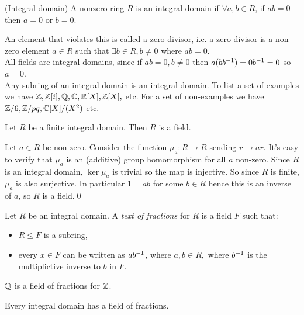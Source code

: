 \documentclass{article}
\begin{document}
\begin{itemize}
\begin{definition}
	(Integral domain) A nonzero ring $ R $ is an integral domain if $ \forall a,b\in R $, if $ ab=0 $ then $ a=0 $ or $ b=0 $.
\end{definition}
An element that violates this is called a zero divisor, i.e. a zero divisor is a non-zero element $ a\in R $ such that $ \exists b\in R, b\ne 0 $ where $ ab=0 $.\\
All fields are integral domains, since if $ ab=0, b\ne 0 $ then $ a(b{b}^{-1})=0{b}^{-1}=0 $ so $ a=0 $.\\
Any subring of an integral domain is an integral domain. To list a set of examples we have $ \mathbb{Z},\mathbb{Z}[i],\mathbb{Q},\mathbb{C},\mathbb{R}[X],\mathbb{Z}[X], $ etc.
For a set of non-examples we have $ \mathbb{Z}/6, \mathbb{Z}/pq, \mathbb{C}[X]/(X^2) $ etc.
\begin{lemma}
  Let $ R $ be a finite integral domain. Then $ R $ is a field.
\end{lemma}
\pf Let $ a\in R $ be non-zero. Consider the function $ \mu_a: R\to R $ sending $ r\to ar $. It's easy to verify that $ \mu_a $ is an (additive) group homomorphism for all $ a $ non-zero. Since $ R $ is an integral domain, $ \ker\mu_a $ is trivial so the map is injective. So since $ R $ is finite, $ \mu_a $ is also surjective. In particular $ 1=ab $ for some $ b\in R $ hence this is an inverse of $ a $, so $ R $ is a field.\qed
\begin{definition}
	Let $ R $ be an integral domain. A \textit{text of fractions} for $ R $ is a field $ F $ such that:
	\begin{itemize}
		\item $ R\le F $ is a subring,
		\item every $ x\in F $ can be written as $ a{b}^{-1} $, where $ a,b\in R, $ where $ {b}^{-1} $ is the multiplictive inverse to $ b $ in $ F $.
	\end{itemize}
\end{definition}
$ \mathbb{Q} $ is a field of fractions for $ \mathbb{Z} $.
\begin{theorem}
  Every integral domain has a field of fractions.
\end{theorem}

\end{itemize}
\end{document}
